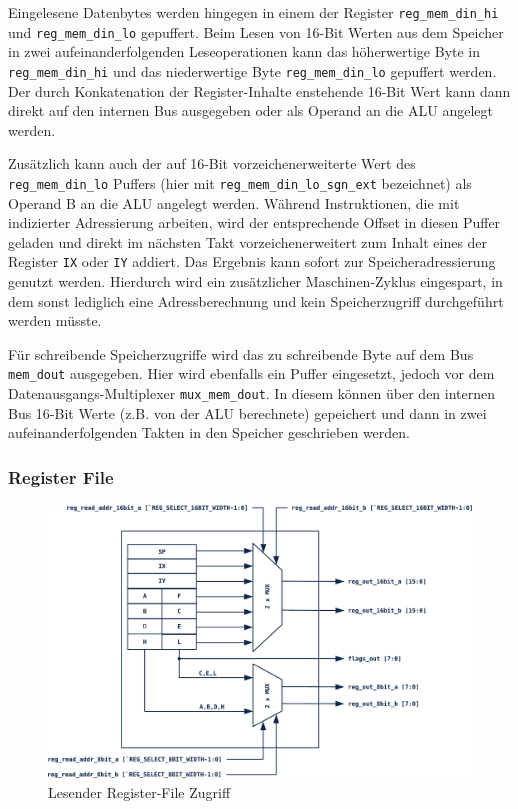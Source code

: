 \documentclass[ngerman, cd=lightcolor]{tudscrreprt}
\begin{document}
Eingelesene Datenbytes werden hingegen in einem der Register
\texttt{reg\_mem\_din\_hi} und \texttt{reg\_mem\_din\_lo} gepuffert. Beim Lesen
von 16-Bit Werten aus dem Speicher in zwei aufeinanderfolgenden Leseoperationen
kann das höherwertige Byte in \texttt{reg\_mem\_din\_hi} und das niederwertige
Byte \texttt{reg\_mem\_din\_lo} gepuffert werden. Der durch Konkatenation der
Register-Inhalte enstehende 16-Bit Wert kann dann direkt auf den internen Bus
ausgegeben oder als Operand an die ALU angelegt werden.

Zusätzlich kann auch der auf 16-Bit vorzeichenerweiterte Wert des
\texttt{reg\_mem\_din\_lo} Puffers (hier mit
\texttt{reg\_mem\_din\_lo\_sgn\_ext} bezeichnet) als Operand B an die ALU
angelegt werden. Während Instruktionen, die mit indizierter Adressierung
arbeiten, wird der entsprechende Offset in diesen Puffer geladen und direkt im
nächsten Takt vorzeichenerweitert zum Inhalt eines der Register \texttt{IX}
oder \texttt{IY} addiert. Das Ergebnis kann sofort zur Speicheradressierung
genutzt werden. Hierdurch wird ein zusätzlicher Maschinen-Zyklus eingespart,
in dem sonst lediglich eine Adressberechnung und kein Speicherzugriff
durchgeführt werden müsste.

Für schreibende Speicherzugriffe wird das zu schreibende Byte auf dem Bus
\texttt{mem\_dout} ausgegeben. Hier wird ebenfalls ein Puffer eingesetzt,
jedoch vor dem Datenausgangs-Multiplexer \texttt{mux\_mem\_dout}. In
diesem können über den internen Bus 16-Bit Werte (z.B. von der ALU berechnete)
gepeichert und dann in zwei aufeinanderfolgenden Takten in den Speicher
geschrieben werden.

\subsubsection{Register File\label{ch:regfile}}

\begin{figure}[htbp]
  \centering
    \includegraphics[width=\textwidth]{resources/pdf/regfile-read.pdf}
  \caption{Lesender Register-File Zugriff}
  \label{img:regfile-read}
\end{figure}
\end{document}
